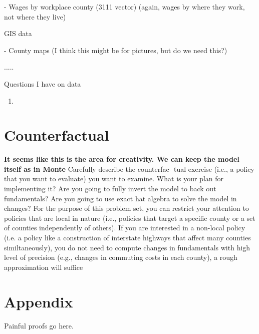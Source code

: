 \documentclass{article}
\begin{document}
- Wages by workplace county (3111 vector) (again, wages by where they work, not where they live)

GIS data

- County maps (I think this might be for pictures, but do we need this?)

..... 

Questions I have on data
\begin{enumerate}
    \item
\end{enumerate}

\section{Counterfactual}
\textbf{It seems like this is the area for creativity. We can keep the model itself as in Monte}
\label{sec:counterfactual}
Carefully describe the counterfac-
tual exercise (i.e., a policy that you want to evaluate) you want to examine. What is your plan for implementing it? Are you going to fully invert the model to back out
fundamentals? Are you going to use exact hat algebra to solve the model in changes?
For the purpose of this problem set, you can restrict your attention to policies that
are local in nature (i.e., policies that target a specific county or a set of counties
independently of others). If you are interested in a non-local policy (i.e. a policy like a
construction of interstate highways that affect many counties similtaneously), you do
not need to compute changes in fundamentals with high level of precision (e.g., changes
in commuting costs in each county), a rough approximation will suffice

\section{Appendix}
Painful proofs go here.


\end{document}
